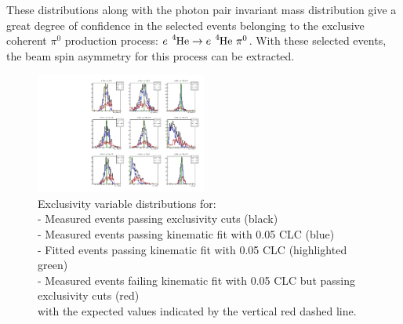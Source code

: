 \documentclass[10pt,prd,aps,showpacs,twocolumn,unsortedaddress]{revtex4-1}
\newcommand\he{{\ce{^{4}He}}}
\newcommand\pio{{\pi^0}}
\begin{document}
  These distributions along with the photon pair invariant mass distribution give a great degree of confidence in the selected events belonging to the exclusive coherent $\pio$ production process: $e ~\he \rightarrow e ~\he ~\pio$. With these selected events, the beam spin asymmetry for this process can be extracted.
  \clearpage
  \begin{figure}[h!]
    \centering
    \captionsetup{width=\linewidth, format = hang}
    \includegraphics[width=0.5\textwidth]{figs/new_algo/with_clc/exc_vars}
    \caption[...]{ Exclusivity variable distributions for: \\
      \qquad - Measured events passing exclusivity cuts (black) \cite{torayev}\\
      \qquad - Measured events passing kinematic fit with 0.05 CLC (blue)  \\
      \qquad - Fitted events   passing kinematic fit with 0.05 CLC (highlighted green) \\
      \qquad - Measured events failing kinematic fit with 0.05 CLC but passing exclusivity cuts (red)  \\
      with the expected values indicated by the vertical red dashed line.
      }
    \label{figs:kinfit:5C:carts}
  \end{figure}


\end{document}
